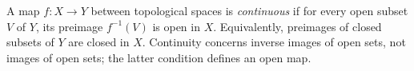 
A map $f:X\to Y$ between topological spaces is \emph{continuous} if for every open subset $V$ of $Y$, its preimage $f^{-1}(V)$ is open in $X$. Equivalently, preimages of closed subsets of $Y$ are closed in $X$. Continuity concerns inverse images of open sets, not images of open sets; the latter condition defines an open map.

